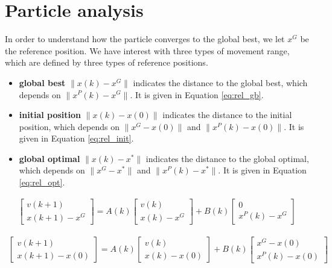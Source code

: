 \section{Particle analysis}
\label{sec:particle}

In order to understand how the particle converges to the global best, we let $ x^{G} $ be the reference position.
We have interest with three types of movement range, which are defined by three types of reference positions.
\begin{itemize}
\item \textbf{global best} $ \lVert x(k) - x^{G} \rVert $ indicates the distance to the global best, which depends on  $ \lVert x^{P}(k) - x^{G} \rVert $.
It is given in Equation \eqref{eq:rel_gb}.
\item \textbf{initial position} $ \lVert x(k) - x(0) \rVert $ indicates the distance to the initial position, which depends on $ \lVert x^{G} - x(0) \rVert $ and $ \lVert x^{P}(k) - x(0) \rVert $.
It is given in Equation \eqref{eq:rel_init}.
\item \textbf{global optimal} $ \lVert x(k) - x^{*} \rVert $ indicates the distance to the global optimal, which depends on $ \lVert x^{G} -  x^{*} \rVert $ and $ \lVert x^{P}(k) -  x^{*} \rVert $.
It is given in Equation \eqref{eq:rel_opt}.
\end{itemize}

\begin{equation}
\label{eq:rel_gb}
\begin{aligned}
\begin{bmatrix}
v(k+1) \\
x(k+1) - x^{G}
\end{bmatrix}
 = A(k) 
\begin{bmatrix}
v(k) \\
x(k) - x^{G}
\end{bmatrix}
+ B(k) 
\begin{bmatrix}
0 \\
x^{P}(k) - x^{G}
\end{bmatrix}
\end{aligned}
\end{equation}

\begin{equation}
\label{eq:rel_init}
\begin{aligned}
\begin{bmatrix}
v(k+1) \\
x(k+1) - x(0)
\end{bmatrix}
 = A(k) 
\begin{bmatrix}
v(k) \\
 x(k) - x(0)
\end{bmatrix}
+ B(k) 
\begin{bmatrix}
x^{G} - x(0) \\
x^{P}(k) - x(0)
\end{bmatrix}
\end{aligned}
\end{equation}

